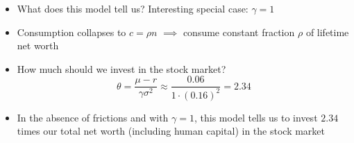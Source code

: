 \documentclass[10pt]{beamer}
\begin{document}
\begin{frame}{}
\begin{itemize}
\item What does this model tell us? Interesting special case: $\gamma = 1$

\item Consumption collapses to $c = \rho n$ $\implies$ consume constant fraction $\rho$ of lifetime net worth

\item How much should we invest in the stock market? 
\begin{equation*}
	\theta = \frac{\mu - r}{\gamma \sigma^2} \approx \frac{0.06}{1 \cdot (0.16)^2} = 2.34
\end{equation*}

\item In the absence of frictions and with $\gamma = 1$, this model tells us to invest $2.34$ times our total net worth (including human capital) in the stock market 

\end{itemize}
\end{frame}












\appendix
\end{document}
